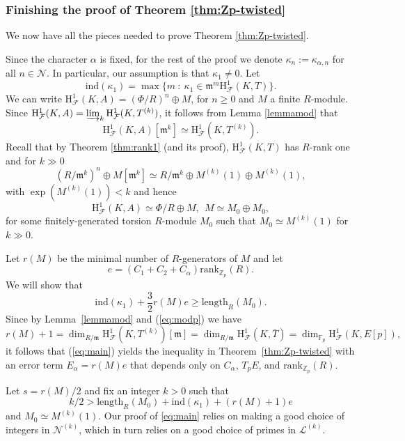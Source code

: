 \documentclass[10pt]{amsart}
\numberwithin{equation}{section}
\theoremstyle{definition}
\theoremstyle{remark}
\newcommand{\Z}{\mathbb{Z}}
\newcommand{\cN}{\mathscr{N}}
\newcommand{\rH}{\mathrm{H}}
\newcommand{\fm}{\mathfrak{m}}
\newcommand{\CF}{\mathcal{F}}
\newcommand{\CL}{\mathscr{L}}
\newcommand{\CN}{\mathscr{N}}
\newcommand{\kap}{\kappa}
\newcommand{\ind}{\mathrm{ind}}
\newcommand{\rank}{\mathrm{rank}}
\begin{document}
\subsubsection{Finishing the proof of Theorem \ref{thm:Zp-twisted}}
We now have all the pieces needed to prove Theorem \ref{thm:Zp-twisted}. 

Since the character $\alpha$ is fixed, for the rest of the proof we denote $\kap_{n}:=\kappa_{\alpha,n}$ for all $n\in\cN$. In particular, our assumption is that $\kap_1\neq 0$. Let 
$$
\ind(\kap_1) = \max\{m \ : \ \kap_1\in \fm^m\rH^1_\CF(K,T)\}.
$$
We can write $\rH^1_\CF(K,A)=(\Phi/R)^n \oplus M$, for $n\geq 0$ and $M$ a finite $R$-module. 
Since $\rH^1_\CF(K,A) = \varinjlim_k \rH^1_\CF(K,T^{(k)})$, it follows from Lemma \ref{lemmamod} that 
\begin{displaymath}
\rH^1_\CF(K,A)[\fm^k] \simeq \rH^1_\CF(K,T^{(k)}).
\end{displaymath}
Recall that by Theorem \ref{thm:rank1} (and its proof),
$\rH^1_\CF(K,T)$ has $R$-rank one and for $k\gg 0$
\begin{displaymath}
(R/\fm^k)^n \oplus M[\fm^k]\simeq R/\fm^k \oplus M^{(k)}(1) \oplus M^{(k)}(1),
\end{displaymath}
with $\exp(M^{(k)}(1))< k$
and hence 
$$
\rH^1_\CF(K,A) \simeq \Phi/R \oplus M, \ \ M \simeq M_0\oplus M_0,
$$
for some finitely-generated torsion $R$-module $M_0$ such that $M_0\simeq M^{(k)}(1)$ for $k\gg 0$.

Let $r(M)$ be the minimal number of $R$-generators of $M$ and let
\[
e = (C_1+C_2 + C_\alpha)\rank_{\Z_p}(R).
\]
We will show that 
\begin{equation}\label{eq:main}
\ind(\kap_1)+\frac{3}{2}r(M)e \geqslant \mathrm{length}_R(M_0).
\end{equation}
Since by Lemma~\ref{lemmamod} and (\ref{eq:modp}) we have
\begin{displaymath}
r(M)+1=\dim_{R/\fm} \rH^1_\CF(K,T^{(k)})[\fm] =\dim_{R/\fm} \rH^1_\CF(K,\bar{T})=\dim_{\mathbb{F}_p} \rH^1_\CF(K,E[p]),
\end{displaymath}
it follows that (\ref{eq:main}) yields the inequality in Theorem~\ref{thm:Zp-twisted} with an error term $E_\alpha=r(M)e$ 
that depends only on $C_{\alpha}$, $T_pE$, and $\rank_{\Z_p}(R)$. 

Let $s=r(M)/2$ and fix an integer $k>0$ such that 
\begin{equation}\label{eq:kbig}
k/2 > \mathrm{length}_R(M_0) + \ind(\kap_1) + (r(M)+1)e
\end{equation}
and $M_0\simeq M^{(k)}(1)$.
Our proof of \eqref{eq:main} relies on making a good choice of integers in $\CN^{(k)}$, which in turn relies on a good choice
of primes in $\CL^{(k)}$. 
\end{document}
